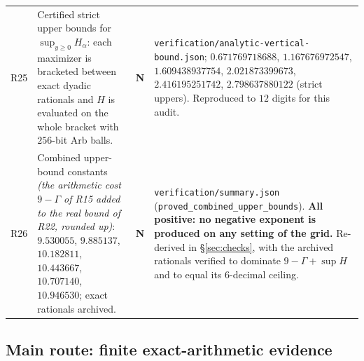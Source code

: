 \documentclass[11pt]{article}
\newcommand{\stN}{\textcolor{numblue}{\textbf{N}}}
\begin{document}
\begin{longtable}{@{}p{}p{}p{}p{}@{}}
R25 & Certified strict upper bounds for $\sup_{y\ge0}H_\alpha$: each maximizer is bracketed between
      exact dyadic rationals and $H$ is evaluated on the whole bracket with $256$-bit Arb balls.
      & \stN & \texttt{verification/analytic-vertical-bound.json};
      $0.671769718688$, $1.167676972547$, $1.609438937754$, $2.021873399673$, $2.416195251742$,
      $2.798637880122$ (strict uppers). Reproduced to $12$ digits for this audit. \\
R26 & Combined upper-bound constants \emph{(the arithmetic cost $9-\Gamma$ of R15 added to the real
      bound of R22, rounded up)}: $9.530055$, $9.885137$, $10.182811$, $10.443667$, $10.707140$,
      $10.946530$; exact rationals archived. & \stN & \texttt{verification/summary.json}
      (\texttt{proved\_combined\_upper\_bounds}). \textbf{All positive: no negative exponent is
      produced on any setting of the grid.} Re-derived in \S\ref{sec:checks}, with the archived
      rationals verified to dominate $9-\Gamma+\sup H$ and to equal its $6$-decimal ceiling. \\
\bottomrule
\end{longtable}

\subsection{Main route: finite exact-arithmetic evidence}
\end{document}

